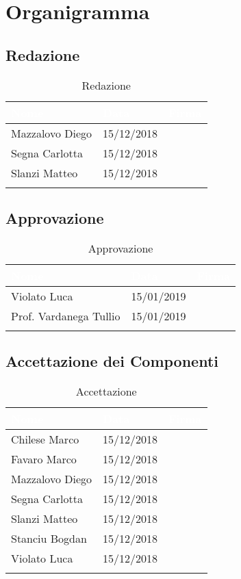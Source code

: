 \section{Organigramma}
\label{Organigramma}


\subsection{Redazione}

\begin{longtable}{|C{.25\textwidth}|C{.16\textwidth}|C{.45\textwidth}|}
\hline
{}\textbf{\textcolor{white}{Nome}} & \textbf{\textcolor{white}{Data}} & \textbf{\textcolor{white}{Firma}}\\
\hline \hline
\endfirsthead
Mazzalovo Diego & 15/12/2018 &  \\
\hline
{}Segna Carlotta & 15/12/2018 & \\
\hline
Slanzi Matteo & 15/12/2018 & \\
\hline
\caption{Redazione}
\label{Tabella Redazione}
\end{longtable}


\subsection{Approvazione}

\begin{longtable}{|C{.25\textwidth}|C{.16\textwidth}|C{.45\textwidth}|}
\hline
{}\textbf{\textcolor{white}{Nome}} & \textbf{\textcolor{white}{Data}} & \textbf{\textcolor{white}{Firma}}\\
\hline \hline
\endfirsthead
Violato Luca & 15/01/2019 &  \\
\hline
{}Prof. Vardanega Tullio & 15/01/2019 & \\
\hline
\caption{Approvazione}
\label{Tabella Approvazione}
\end{longtable}

\subsection{Accettazione dei Componenti}

\begin{longtable}{|C{.25\textwidth}|C{.16\textwidth}|C{.45\textwidth}|}
\hline
{}\textbf{\textcolor{white}{Nome}} & \textbf{\textcolor{white}{Data}} & \textbf{\textcolor{white}{Firma}}\\
\hline \hline
\endfirsthead
Chilese Marco & 15/12/2018 &  \\
\hline
{}Favaro Marco & 15/12/2018 &  \\
\hline
Mazzalovo Diego & 15/12/2018 &  \\
\hline
{}Segna Carlotta & 15/12/2018 &  \\
\hline
Slanzi Matteo & 15/12/2018 &  \\
\hline
{}Stanciu Bogdan & 15/12/2018 &  \\
\hline
Violato Luca & 15/12/2018 & \\
\hline
\caption{Accettazione}
\label{Tabella Accettazione}
\end{longtable}

